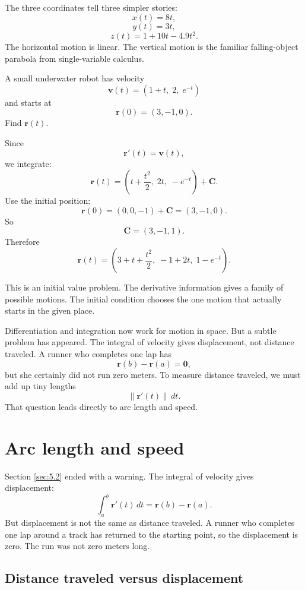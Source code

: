 The three coordinates tell three simpler stories:
\[
    x(t)=8t,
\]
\[
    y(t)=3t,
\]
\[
    z(t)=1+10t-4.9t^2.
\]
The horizontal motion is linear.  The vertical motion is the familiar falling-object
parabola from single-variable calculus.

\begin{example}
A small underwater robot has velocity
\[
    \mathbf v(t)=(1+t,\;2,\;e^{-t})
\]
and starts at
\[
    \mathbf r(0)=(3,-1,0).
\]
Find \(\mathbf r(t)\).

Since
\[
    \mathbf r'(t)=\mathbf v(t),
\]
we integrate:
\[
    \mathbf r(t)
    =
    \left(
        t+\frac{t^2}{2},\;
        2t,\;
        -e^{-t}
    \right)+\mathbf C.
\]
Use the initial position:
\[
    \mathbf r(0)=(0,0,-1)+\mathbf C=(3,-1,0).
\]
So
\[
    \mathbf C=(3,-1,1).
\]
Therefore
\[
\boxed{
    \mathbf r(t)=
    \left(
        3+t+\frac{t^2}{2},\;
        -1+2t,\;
        1-e^{-t}
    \right).
}
\]
\end{example}

This is an initial value problem.  The derivative information gives a family of possible
motions.  The initial condition chooses the one motion that actually starts in the given
place.

Differentiation and integration now work for motion in space.  But a subtle problem has
appeared.  The integral of velocity gives displacement, not distance traveled.  A runner
who completes one lap has
\[
    \mathbf r(b)-\mathbf r(a)=\mathbf 0,
\]
but she certainly did not run zero meters.  To measure distance traveled, we must add
up tiny lengths
\[
    \|\mathbf r'(t)\|\,dt.
\]
That question leads directly to arc length and speed.

\section{Arc length and speed}
\label{sec:5.3}

Section \ref{sec:5.2} ended with a warning.  The integral of velocity gives
displacement:
\[
    \int_a^b \mathbf r'(t)\,dt=\mathbf r(b)-\mathbf r(a).
\]
But displacement is not the same as distance traveled.  A runner who completes one lap
around a track has returned to the starting point, so the displacement is zero.  The run
was not zero meters long.

\subsection{Distance traveled versus displacement}

